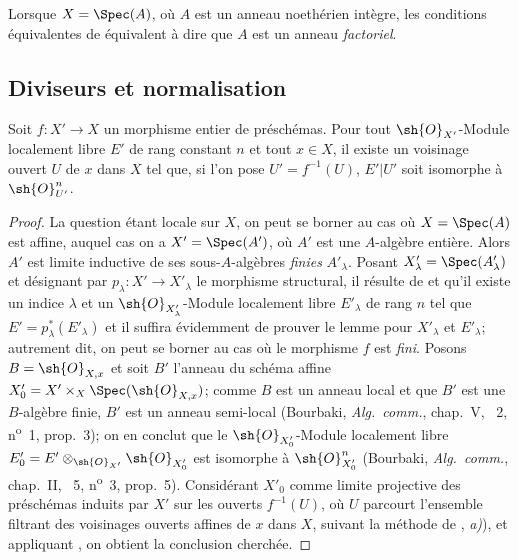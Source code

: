 \begin{remark}[21.7.7]
\label{IV.21.7.7}
Lorsque $X=\Spec(A)$, où $A$ est un anneau noethérien intègre, les conditions équivalentes de  équivalent à dire que $A$ est un anneau \emph{factoriel}.
\end{remark}

\subsection{Diviseurs et normalisation}

\begin{lemma}[21.8.1]
\label{IV.21.8.1}
Soit $f:X'\to X$ un morphisme entier de préschémas.
Pour tout $\sh{O}_{X'}$-Module localement libre $E'$ de rang constant $n$ et tout $x\in X$, il existe un voisinage ouvert $U$ de $x$ dans $X$ tel que, si l'on pose $U'=f^{-1}(U)$, $E'|U'$ soit isomorphe à $\sh{O}_{U'}^n$.
\end{lemma}

\begin{proof}
La question étant locale sur $X$, on peut se borner au cas où $X=\Spec(A)$ est affine, auquel cas on a $X'=\Spec(A')$, où $A'$ est une $A$-algèbre entière.
Alors $A'$ est limite inductive de ses sous-$A$-algèbres \emph{finies} $A'_\lambda$.
Posant $X'_\lambda=\Spec(A'_\lambda)$ et désignant par $p_\lambda:X'\to X'_\lambda$ le morphisme structural, il résulte de  et  qu'il existe un indice $\lambda$ et un $\sh{O}_{X'_\lambda}$-Module localement libre $E'_\lambda$ de rang $n$ tel que $E'=p_\lambda^*(E'_\lambda)$ et il suffira évidemment de prouver le lemme pour $X'_\lambda$ et $E'_\lambda$;
autrement dit, on peut se borner au cas où le morphisme $f$ est \emph{fini}.
Posons $B=\sh{O}_{X,x}$ et soit $B'$ l'anneau du schéma affine $X'_0=X'\times_X\Spec(\sh{O}_{X,x})$;
comme $B$ est un anneau local et que $B'$ est une $B$-algèbre finie, $B'$ est un anneau semi-local (Bourbaki, \emph{Alg.\ comm.}, chap.~V, \textsection~2, n\textsuperscript{o}~1, prop.~3);
on en conclut que le $\sh{O}_{X'_0}$-Module localement libre $E'_0=E'\otimes_{\sh{O}_{X'}}\sh{O}_{X'_0}$ est isomorphe à $\sh{O}_{X'_0}^n$ (Bourbaki, \emph{Alg.\ comm.}, chap.~II, \textsection~5, n\textsuperscript{o}~3, prop.~5).
Considérant $X'_0$ comme limite
projective des préschémas induits par $X'$ sur les ouverts $f^{-1}(U)$, où $U$ parcourt l'ensemble filtrant des voisinages ouverts affines de $x$ dans $X$, suivant la méthode de , \emph{a)}), et appliquant , on obtient la conclusion cherchée.
\end{proof}

